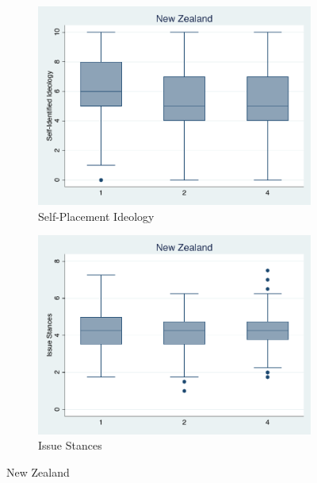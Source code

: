 \documentclass[12pt, titlepage]{article}
\begin{document}
\begin{figure}[H]
	\centering
	\begin{subfigure}[b]{0.475\textwidth}   
		\centering 
		\includegraphics[width=\textwidth]{IdeoBP/NewZealand}
		\caption{Self-Placement Ideology}
	\end{subfigure}
	\hfill
	\begin{subfigure}[b]{0.475\textwidth}
		\centering 
		\includegraphics[width=\textwidth]{BoxLib/NZealand}
		\caption{Issue Stances}
	\end{subfigure}
	\caption{New Zealand}
	\label{NewZealand}
\end{figure}
\end{document}
